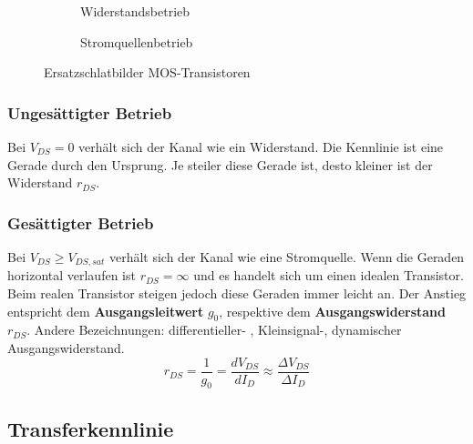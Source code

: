 \begin{figure}[h]
	\centering
	\begin{subfigure}[b]{6cm}
		\centering
		{}
		\caption{Widerstandsbetrieb}
	\end{subfigure} \qquad\qquad
	\begin{subfigure}[b]{7cm}
		\centering
		{}
		\caption{Stromquellenbetrieb}
	\end{subfigure}
	\caption{Ersatzschlatbilder MOS-Transistoren}
\end{figure}

\subsubsection{Ungesättigter Betrieb}
Bei $V_{DS} = 0$ verhält sich der Kanal wie ein Widerstand. Die Kennlinie ist eine Gerade durch den Ursprung. Je steiler diese Gerade ist, desto
kleiner ist der Widerstand $r_{DS}$.

\subsubsection{Gesättigter Betrieb}
Bei $V_{DS} \geq V_{DS,sat}$ verhält sich der Kanal wie eine Stromquelle. Wenn die Geraden horizontal verlaufen ist $r_{DS} = \infty$ und
es handelt sich um einen idealen Transistor. Beim realen Transistor steigen jedoch diese Geraden immer leicht an.
Der Anstieg entspricht dem \textbf{Ausgangsleitwert} $g_0$, respektive dem \textbf{Ausgangswiderstand} $r_{DS}$.
Andere Bezeichnungen: differentieller- , Kleinsignal-, dynamischer Ausgangswiderstand.
\[
	r_{DS} = \frac{1}{g_0} = \frac{dV_{DS}}{dI_{D}} \approx \frac{\Delta V_{DS}}{\Delta I_D}
\]



\subsection{Transferkennlinie}



